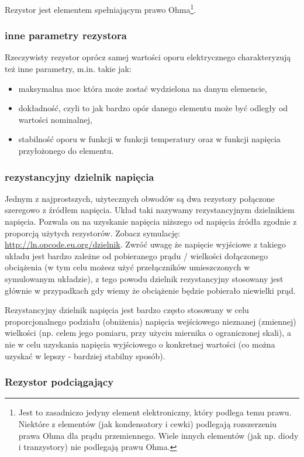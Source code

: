 Rezystor jest elementem spełniającym prawo Ohma\footnote{Jest to zasadniczo jedyny element elektroniczny, który podlega temu prawu. Niektóre z elementów (jak kondensatory i cewki) podlegają rozszerzeniu prawa Ohma dla prądu przemiennego. Wiele innych elementów (jak np. diody i tranzystory) nie podlegają prawu Ohma.}.

\subsubsection{inne parametry rezystora}
Rzeczywisty rezystor oprócz samej wartości oporu elektrycznego charakteryzują też inne parametry, m.in. takie jak:
\begin{itemize}
\item maksymalna moc która może zostać wydzielona na danym elemencie,
\item dokładność, czyli to jak bardzo opór danego elementu może być odległy od wartości nominalnej,
\item stabilność oporu w funkcji w funkcji temperatury oraz w funkcji napięcia przyłożonego do elementu.
\end{itemize}

\subsubsection{rezystancyjny dzielnik napięcia}\label{dzielnik}

Jednym z najprostszych, użytecznych obwodów są dwa rezystory połączone szeregowo z źródłem napięcia. Układ taki nazywamy rezystancyjnym dzielnikiem napięcia. Pozwala on na uzyskanie napięcia niższego od napięcia źródła zgodnie z proporcją użytych rezystorów. Zobacz symulację: \url{http://ln.opcode.eu.org/dzielnik}.
Zwróć uwagę że napięcie wyjściowe z takiego układu jest bardzo zależne od pobieranego prądu / wielkości dołączonego obciążenia (w tym celu możesz użyć przełączników umieszczonych w symulowanym układzie), z tego powodu dzielnik rezystancyjny stosowany jest głównie w przypadkach gdy wiemy że obciążenie będzie pobierało niewielki prąd.

Rezystancyjny dzielnik napięcia jest bardzo często stosowany w celu proporcjonalnego podziału (obniżenia) napięcia wejściowego nieznanej (zmiennej) wielkości (np. celem jego pomiaru, przy użyciu miernika o ograniczonej skali),
a nie w celu uzyskania napięcia wyjściowego o konkretnej wartości (co można uzyskać w lepszy - bardziej stabilny sposób).

\subsubsection{Rezystor podciągający}


